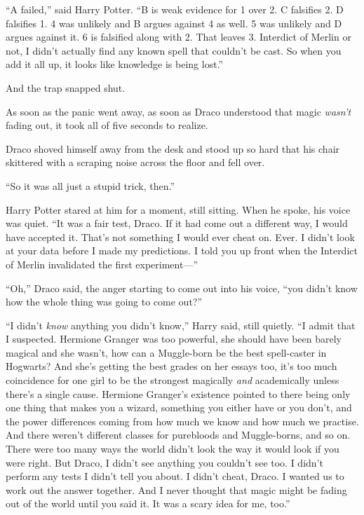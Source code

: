 “A failed,” said Harry Potter. “B is weak evidence for 1 over 2. C falsifies 2. D falsifies 1. 4 was unlikely and B argues against 4 as well. 5 was unlikely and D argues against it. 6 is falsified along with 2. That leaves 3. Interdict of Merlin or not, I didn’t actually find any known spell that couldn’t be cast. So when you add it all up, it looks like knowledge is being lost.”

And the trap snapped shut.

As soon as the panic went away, as soon as Draco understood that magic \emph{wasn’t} fading out, it took all of five seconds to realize.

Draco shoved himself away from the desk and stood up so hard that his chair skittered with a scraping noise across the floor and fell over.

“So it was all just a stupid trick, then.”

Harry Potter stared at him for a moment, still sitting. When he spoke, his voice was quiet. “It was a fair test, Draco. If it had come out a different way, I would have accepted it. That’s not something I would ever cheat on. Ever. I didn’t look at your data before I made my predictions. I told you up front when the Interdict of Merlin invalidated the first experiment—”

“Oh,” Draco said, the anger starting to come out into his voice, “you didn’t know how the whole thing was going to come out?”

“I didn’t \emph{know} anything you didn’t know,” Harry said, still quietly. “I admit that I suspected. Hermione Granger was too powerful, she should have been barely magical and she wasn’t, how can a Muggle-born be the best spell-caster in Hogwarts? And she’s getting the best grades on her essays too, it’s too much coincidence for one girl to be the strongest magically \emph{and} academically unless there’s a single cause. Hermione Granger’s existence pointed to there being only one thing that makes you a wizard, something you either have or you don’t, and the power differences coming from how much we know and how much we practise. And there weren’t different classes for purebloods and Muggle-borns, and so on. There were too many ways the world didn’t look the way it would look if you were right. But Draco, I didn’t see anything you couldn’t see too. I didn’t perform any tests I didn’t tell you about. I didn’t cheat, Draco. I wanted us to work out the answer together. And I never thought that magic might be fading out of the world until you said it. It was a scary idea for me, too.”

